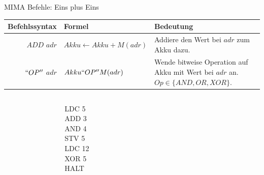 \documentclass[handout]{beamer}
\begin{document}
\begin{frame}{MIMA Befehle: Eins plus Eins}
	\begin{tabular}{r | l p{5cm} }
		Befehlssyntax & Formel & Bedeutung\\\hline\hline 
		$ADD$ $adr$ & $Akku \leftarrow Akku + M(adr)$ & Addiere den Wert bei $adr$ zum Akku dazu.\\\hline
		$``OP''$ $adr$ & $Akku ``OP'' M(adr)$ & Wende bitweise Operation auf Akku mit Wert bei $adr$ an. $Op \in \{AND, OR, XOR\}$.
	\end{tabular}
	
	\bp 
	\vspace{.2cm}
	\vspace{.2cm}
	
	\begin{columns}
        \begin{column}{0.06\textwidth}
        \end{column}

		\begin{column}{0.15\textwidth}
			LDC 5 \\ ADD 3 \\ AND 4 \\ STV 5 \\ LDC 12 \\ XOR 5 \\ HALT
		\end{column}

        \vline
        \begin{column}{0.06\textwidth}
        \end{column}
		
		\begin{column}{0.24\textwidth}
			\begin{memory}
			\end{memory}
		\end{column}
	\end{columns}
\end{frame}
\end{document}
